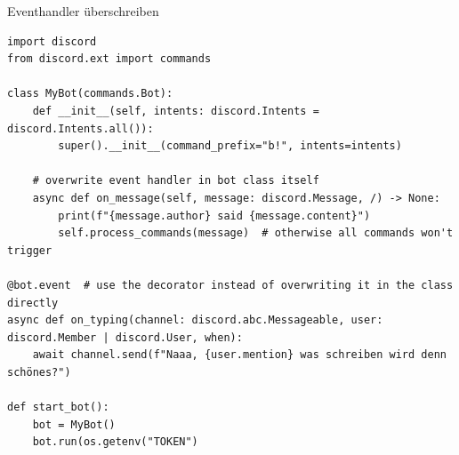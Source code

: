 \documentclass[12pt, aspectratio=169, usepdftitle=false]{beamer}
\begin{document}
\begin{frame}[fragile]{Eventhandler überschreiben}
	\begin{lstlisting}[language=pytiny]
import discord
from discord.ext import commands

class MyBot(commands.Bot):
    def __init__(self, intents: discord.Intents = discord.Intents.all()):
        super().__init__(command_prefix="b!", intents=intents)
        
    # overwrite event handler in bot class itself
    async def on_message(self, message: discord.Message, /) -> None:
        print(f"{message.author} said {message.content}")
        self.process_commands(message)  # otherwise all commands won't trigger

@bot.event  # use the decorator instead of overwriting it in the class directly
async def on_typing(channel: discord.abc.Messageable, user: discord.Member | discord.User, when):
    await channel.send(f"Naaa, {user.mention} was schreiben wird denn schönes?")

def start_bot():
    bot = MyBot()
    bot.run(os.getenv("TOKEN")
	\end{lstlisting}
\end{frame}
\end{document}
